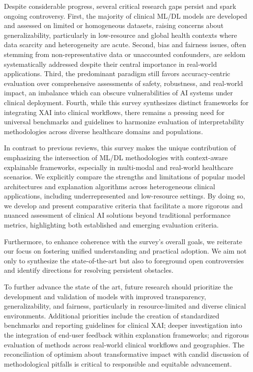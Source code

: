 \documentclass[sigconf]{acmart}
\begin{document}
Despite considerable progress, several critical research gaps persist and spark ongoing controversy. First, the majority of clinical ML/DL models are developed and assessed on limited or homogeneous datasets, raising concerns about generalizability, particularly in low-resource and global health contexts where data scarcity and heterogeneity are acute. Second, bias and fairness issues, often stemming from non-representative data or unaccounted confounders, are seldom systematically addressed despite their central importance in real-world applications. Third, the predominant paradigm still favors accuracy-centric evaluation over comprehensive assessments of safety, robustness, and real-world impact, an imbalance which can obscure vulnerabilities of AI systems under clinical deployment. Fourth, while this survey synthesizes distinct frameworks for integrating XAI into clinical workflows, there remains a pressing need for universal benchmarks and guidelines to harmonize evaluation of interpretability methodologies across diverse healthcare domains and populations.

In contrast to previous reviews, this survey makes the unique contribution of emphasizing the intersection of ML/DL methodologies with context-aware explainable frameworks, especially in multi-modal and real-world healthcare scenarios. We explicitly compare the strengths and limitations of popular model architectures and explanation algorithms across heterogeneous clinical applications, including underrepresented and low-resource settings. By doing so, we develop and present comparative criteria that facilitate a more rigorous and nuanced assessment of clinical AI solutions beyond traditional performance metrics, highlighting both established and emerging evaluation criteria.

Furthermore, to enhance coherence with the survey's overall goals, we reiterate our focus on fostering unified understanding and practical adoption. We aim not only to synthesize the state-of-the-art but also to foreground open controversies and identify directions for resolving persistent obstacles.

To further advance the state of the art, future research should prioritize the development and validation of models with improved transparency, generalizability, and fairness, particularly in resource-limited and diverse clinical environments. Additional priorities include the creation of standardized benchmarks and reporting guidelines for clinical XAI; deeper investigation into the integration of end-user feedback within explanation frameworks; and rigorous evaluation of methods across real-world clinical workflows and geographies. The reconciliation of optimism about transformative impact with candid discussion of methodological pitfalls is critical to responsible and equitable advancement. 
\end{document}

